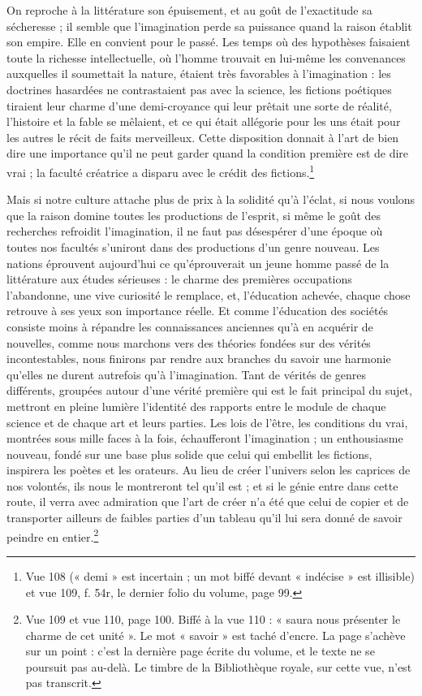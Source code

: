 \documentclass[11pt,a4paper]{article}
\begin{document}
On reproche à la littérature son épuisement, et au goût de l'exactitude sa
sécheresse ; il semble que l'imagination perde sa puissance quand la raison
établit son empire. Elle en convient pour le passé. Les temps où des hypothèses
faisaient toute la richesse intellectuelle, où l'homme trouvait en lui-même les
convenances auxquelles il soumettait la nature, étaient très favorables à
l'imagination : les doctrines hasardées ne contrastaient pas avec la science, les
fictions poétiques tiraient leur charme d'une demi-croyance qui leur prêtait une
sorte de réalité, l'histoire et la fable se mêlaient, et ce qui était allégorie
pour les uns était pour les autres le récit de faits merveilleux. Cette
disposition donnait à l'art de bien dire une importance qu'il ne peut garder quand
la condition première est de dire vrai ; la faculté créatrice a disparu avec le
crédit des fictions.\footnote{Vue 108 (« demi » est incertain ; un mot biffé
devant « indécise » est illisible) et vue 109, f. 54r, le dernier folio du
volume, page 99.}

Mais si notre culture attache plus de prix à la solidité qu'à l'éclat, si nous
voulons que la raison domine toutes les productions de l'esprit, si même le goût
des recherches refroidit l'imagination, il ne faut pas désespérer d'une époque où
toutes nos facultés s'uniront dans des productions d'un genre nouveau. Les nations
éprouvent aujourd'hui ce qu'éprouverait un jeune homme passé de la littérature aux
études sérieuses : le charme des premières occupations l'abandonne, une vive
curiosité le remplace, et, l'éducation achevée, chaque chose retrouve à ses yeux
son importance réelle. Et comme l'éducation des sociétés consiste moins à répandre
les connaissances anciennes qu'à en acquérir de nouvelles, comme nous marchons
vers des théories fondées sur des vérités incontestables, nous finirons par
rendre aux branches du savoir une harmonie qu'elles ne durent autrefois qu'à
l'imagination. Tant de vérités de genres différents, groupées autour d'une vérité
première qui est le fait principal du sujet, mettront en pleine lumière
l'identité des rapports entre le module de chaque science et de chaque art et
leurs parties. Les lois de l'être, les conditions du vrai, montrées sous mille
faces à la fois, échaufferont l'imagination ; un enthousiasme nouveau, fondé sur
une base plus solide que celui qui embellit les fictions, inspirera les poètes et
les orateurs. Au lieu de créer l'univers selon les caprices de nos volontés, ils
nous le montreront tel qu'il est ; et si le génie entre dans cette route, il verra
avec admiration que l'art de créer n'a été que celui de copier et de transporter
ailleurs de faibles parties d'un tableau qu'il lui sera donné de savoir peindre
en entier.\footnote{Vue 109 et vue 110, page 100. Biffé à la vue 110 : « saura
nous présenter le charme de cet unité ». Le mot « savoir » est taché d'encre. La
page s'achève sur un point : c'est la dernière page écrite du volume, et le texte
ne se poursuit pas au-delà. Le timbre de la Bibliothèque royale, sur cette vue,
n'est pas transcrit.}
\end{document}
